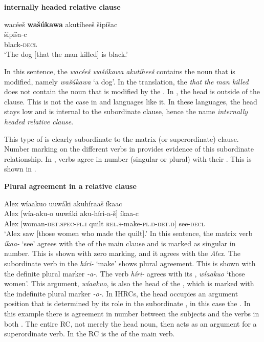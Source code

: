 \documentclass[output=paper]{LSP/langsci}
\begin{document}
\ea \textbf{ internally headed relative clause} \label{boyle11}

\glll {\ob}wac\'ee\v{s} \textbf{wa\v{s}\'ukawa} akut\'ihee\v{s}{\cb} \v{s}ip\'i\v{s}ac\\
[wac\'ee-\v{s}    \textbf{wa\v{s}\'uka-wa}  aku-t\'i-hee-\v{s}]  \v{s}ip\'i\v{s}a-c\\
[man-\textsc{det.d} \textbf{dog-\textsc{det.i}}  \textsc{rel.s}-die-\textsc{3.caus.d.sg}-\textsc{det.d}] black-\textsc{decl}\\
\trans `The dog [that the man killed] is black.' 
\z

In this sentence, the  \textit{wac\'ee\v{s} wa\v{s}\'ukawa akut\'ihee\v{s}} contains the noun that is modified, namely \textit{wa\v{s}\'ukawa} `a dog'. In the  translation, the  \textit{that the man killed} does not contain the noun that is modified by the . In , the head is outside of the clause. This is not the case in  and languages like it.  In these languages, the head stays low and is internal to the subordinate clause, hence the name \textit{internally headed relative clause}.
	
This type of  is clearly subordinate to the matrix (or superordinate) clause. Number marking on the different verbs in  provides evidence of this subordinate relationship. In , verbs agree in number (singular or plural) with their . This is shown in .

\ea \textbf{Plural agreement in a  relative clause} \label{boyle12}

\glll Alex {\ob}w\'iaakuo uuw\'aki akuh\'iraa\v{s}{\cb} \'ikaac\\
Alex [w\'ia-aku-o    uuw\'aki  aku-h\'iri-a-\v{s}]  \'ikaa-c\\
Alex [woman-\textsc{det.spec-pl.i} quilt  \textsc{rel.s}-make-\textsc{pl.d}-\textsc{det.d}] see-\textsc{decl}\\
\trans `Alex saw [those women who made the quilt].' 
\z
In this sentence, the matrix verb \textit{\'ikaa-} `see' agrees with the  of the main clause and is marked as singular in number. This is shown with zero marking, and it agrees with the  \textit{Alex}. The subordinate verb in the  \textit{h\'iri-} `make' shows plural agreement. This is shown with the definite plural marker \textit{-a-}.  The verb \textit{h\'iri-} agrees with its , \textit{w\'iaakuo} `those women'. This argument, \textit{w\'iaakuo}, is also the head of the , which is marked with the indefinite plural marker \textit{-o-}. In IHRCs, the head occupies an argument position that is determined by its role in the subordinate , in this case the . In this example there is agreement in number between the subjects and the verbs in both . The entire RC, not merely the head noun, then acts as an argument for a superordinate verb. In  the RC is the  of the main verb.
\end{document}
